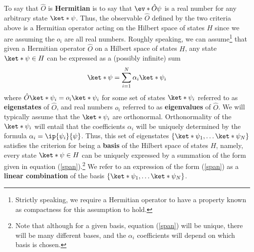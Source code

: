 \documentclass[12pt]{report}
\begin{document}
To say that $\hat{O}$ is \textbf{Hermitian} is to say that $\ev*{\hat{O}}{\psi}$ is a real number for any arbitrary state $\ket*{\psi}$. Thus, the observable $\hat{O}$ defined by the two criteria above is a Hermitian operator acting on the Hilbert space of states $H$ since we are assuming the $o_i$ are all real numbers. Roughly speaking, we can assume\footnote{Strictly speaking, we require a Hermitian operator to have a property known as compactness for this assumption to hold.}  that given a Hermitian operator $\hat{O}$ on a Hilbert space of states $H$, any state $\ket*{\psi}\in H$ can be expressed as a (possibly infinite) sum 
\begin{equation}\label{span}
\ket*{\psi}=\sum_{i=1}^N\alpha_i\ket*{\psi_i}
\end{equation}
where $\hat{O}\ket*{\psi_i}=o_i\ket*{\psi_i}$ for some set of states $\ket*{\psi_i}$ referred to as \textbf{eigenstates}\label{eigendef} of $\hat{O}$, and real numbers $o_i$ referred to as \textbf{eigenvalues} of $\hat{O}$. We will typically assume that the $\ket*{\psi_i}$ are orthonormal. Orthonormality of the $\ket*{\psi_i}$ will entail that the coefficients $\alpha_i$ will be uniquely determined by the formula $\alpha_i=\ip{\psi_i}{\psi}$. Thus, this set of eigenstates $\{\ket*{\psi_1},\ldots\ket*{\psi_N}\}$ satisfies the criterion for being a \textbf{basis} of the Hilbert space of states $H$, namely, every state $\ket*{\psi}\in H$ can be uniquely expressed by a summation of the form given in equation (\ref{span}).\footnote{Note that although for a given basis, equation (\ref{span}) will be unique, there will be many different bases, and the $\alpha_i$ coefficients will depend on which basis is chosen.} We refer to an expression of the form (\ref{span}) as a \textbf{linear combination} of the basis $\{\ket*{\psi_1},\ldots\ket*{\psi_N}\}$. 


\end{document}
